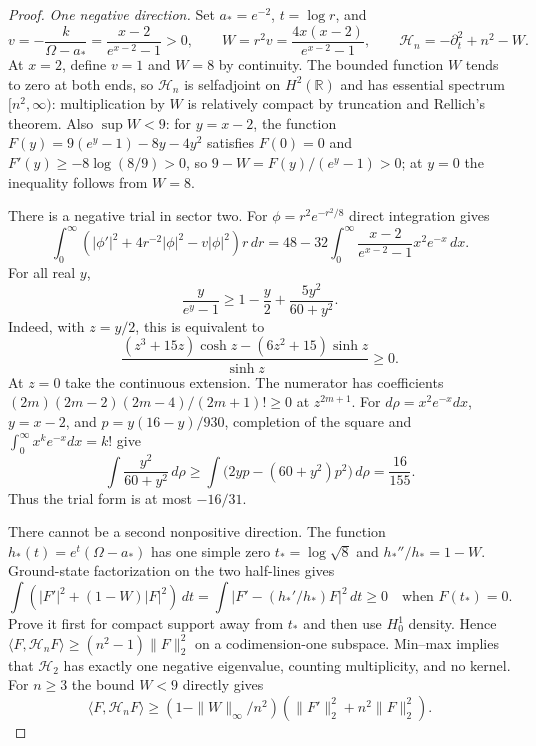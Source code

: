 \begin{proof}
\emph{One negative direction.}
Set $a_*=e^{-2}$, $t=\log r$, and
\[
 v=-\frac{k}{\Omega-a_*}
       =\frac{x-2}{e^{x-2}-1}>0,\qquad
 W=r^2v=\frac{4x(x-2)}{e^{x-2}-1},\qquad
 \mathcal H_n=-\partial_t^2+n^2-W.
\]
At $x=2$, define $v=1$ and $W=8$ by continuity. The bounded function $W$ tends to
zero at both ends, so $\mathcal H_n$ is selfadjoint on $H^2(\mathbb R)$
and has essential spectrum $[n^2,\infty)$: multiplication by $W$ is
relatively compact by truncation and Rellich's theorem. Also $\sup W<9$: for $y=x-2$, the function
$F(y)=9(e^y-1)-8y-4y^2$ satisfies $F(0)=0$ and
$F'(y)\ge-8\log(8/9)>0$, so $9-W=F(y)/(e^y-1)>0$;
at $y=0$ the inequality follows from $W=8$.

There is a negative trial in sector two. For
$\phi=r^2e^{-r^2/8}$ direct integration gives
\[
 \int_0^\infty(|\phi'|^2+4r^{-2}|\phi|^2-v|\phi|^2)r\,dr
 =48-32\int_0^\infty\frac{x-2}{e^{x-2}-1}x^2e^{-x}\,dx.
\]
For all real $y$,
\begin{equation}\label{eq:short-seed-rational}
 \frac y{e^y-1}\ge1-\frac y2+\frac{5y^2}{60+y^2}.
\end{equation}
Indeed, with $z=y/2$, this is equivalent to
\[
 \frac{(z^3+15z)\cosh z-(6z^2+15)\sinh z}{\sinh z}\ge0.
\]
At $z=0$ take the continuous extension. The numerator has coefficients
$(2m)(2m-2)(2m-4)/(2m+1)!\ge0$ at $z^{2m+1}$.
For $d\rho=x^2e^{-x}dx$, $y=x-2$, and $p=y(16-y)/930$,
completion of the square and $\int_0^\infty x^ke^{-x}dx=k!$ give
\[
 \int\frac{y^2}{60+y^2}\,d\rho
 \ge\int\bigl(2yp-(60+y^2)p^2\bigr)\,d\rho=\frac{16}{155}.
\]
Thus the trial form is at most $-16/31$.

There cannot be a second nonpositive direction. The function
$h_*(t)=e^t(\Omega-a_*)$ has one simple zero
$t_*=\log\sqrt8$ and $h_*''/h_*=1-W$. Ground-state factorization
on the two half-lines gives
\[
 \int(|F'|^2+(1-W)|F|^2)\,dt
    =\int|F'-(h_*'/h_*)F|^2\,dt\ge0
 \quad\text{when }F(t_*)=0.
\]
Prove it first for compact support away from $t_*$ and then use
$H^1_0$ density. Hence
$\langle F,\mathcal H_nF\rangle\ge(n^2-1)\|F\|_2^2$ on a
codimension-one subspace. Min--max implies that $\mathcal H_2$ has
exactly one negative eigenvalue, counting multiplicity, and no kernel.
For $n\ge3$ the bound $W<9$ directly gives
\begin{equation}\label{eq:short-seed-higher}
 \langle F,\mathcal H_nF\rangle\ge
 (1-\|W\|_\infty/n^2)(\|F'\|_2^2+n^2\|F\|_2^2).
\end{equation}


\end{proof}
